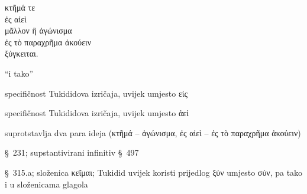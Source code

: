 {\large
\begin{greek}
\noindent κτῆμά τε \\
\tabto{2em} ἐς αἰεὶ \\
μᾶλλον ἢ ἀγώνισμα \\
\tabto{2em} ἐς τὸ παραχρῆμα ἀκούειν \\
ξύγκειται.\\

\end{greek}
}

\begin{description}[noitemsep]
\item[τε] ``i tako''
\item[ἐς] specifičnost Tukididova izričaja, uvijek umjesto εἰς
\item[αἰεὶ] specifičnost Tukididova izričaja, uvijek umjesto ἀεί
\item[μᾶλλον ἢ] suprotstavlja dva para ideja \textgreek[variant=ancient]{(κτῆμά – ἀγώνισμα, ἐς αἰεὶ – ἐς τὸ παραχρῆμα ἀκούειν)}
\item[ἀκούειν] §~231; supstantivirani infinitiv §~497
\item[ξύγκειται] §~315.a; složenica κεῖμαι; Tukidid uvijek koristi prijedlog ξύν umjesto σύν, pa tako i u složenicama glagola

\end{description}



